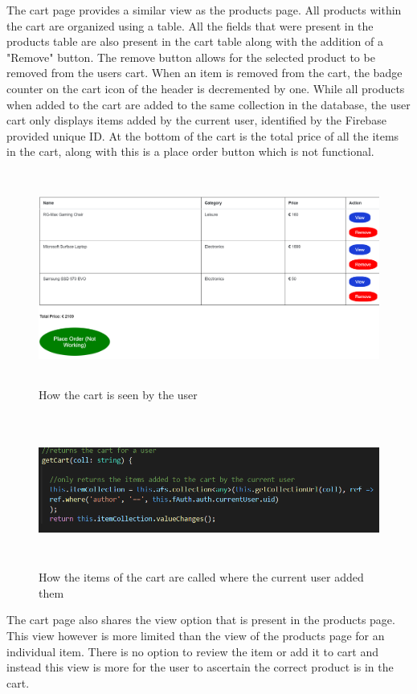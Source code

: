 \newpage
The cart page provides a similar view as the products page. All products within the cart are organized using a table. All the fields that were present in the products table are also present in the cart table along with the addition of a "Remove" button. The remove button allows for the selected product to be removed from the users cart. When an item is removed from the cart, the badge counter on the cart icon of the header is decremented by one. While all products when added to the cart are added to the same collection in the database, the user cart only displays items added by the current user, identified by the Firebase provided unique ID. At the bottom of the cart is the total price of all the items in the cart, along with this is a place order button which is not functional. 


\begin{figure}[h!]
    	\caption{How the cart is seen by the user}
	\centering
	\includegraphics[width=12cm, height=7cm]{images/cartview.png}
\end{figure}
\begin{figure}[h!]
    	\caption{How the items of the cart are called where the current user added them}
	\centering
	\includegraphics[width=12cm, height=5cm]{images/cartcode.png}
\end{figure}

\newpage
The cart page also shares the view option that is present in the products page. This view however is more limited than the view of the products page for an individual item. There is no option to review the item or add it to cart and instead this view is more for the user to ascertain the correct product is in the cart.

